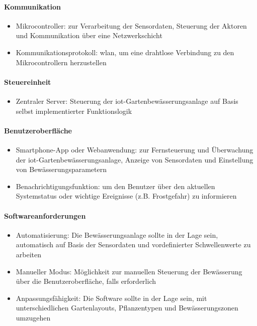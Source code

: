 \paragraph{Kommunikation}
\begin{itemize}
  \item Mikrocontroller: zur Verarbeitung der Sensordaten, Steuerung der Aktoren und Kommunikation über eine Netzwerkschicht
  \item Kommunikationsprotokoll: \gls{wlan}, um eine drahtlose Verbindung zu den Mikrocontrollern herzustellen
\end{itemize}

\paragraph{Steuereinheit}
\begin{itemize}
  \item Zentraler Server: Steuerung der \gls{iot}-Gartenbewässerungsanlage auf Basis selbst implementierter Funktionslogik
\end{itemize}

\paragraph{Benutzeroberfläche}
\begin{itemize}
  \item Smartphone-App oder Webanwendung: zur Fernsteuerung und Überwachung der \gls{iot}-Gartenbewässerungsanlage, Anzeige von Sensordaten und Einstellung von Bewässerungsparametern
  \item Benachrichtigungsfunktion: um den Benutzer über den aktuellen Systemstatus oder wichtige Ereignisse (z.B. Frostgefahr) zu informieren
\end{itemize}

\paragraph{Softwareanforderungen}
\begin{itemize}
  \item Automatisierung: Die Bewässerungsanlage sollte in der Lage sein, automatisch auf Basis der Sensordaten und vordefinierter Schwellenwerte zu arbeiten
  \item Manueller Modus: Möglichkeit zur manuellen Steuerung der Bewässerung über die Benutzeroberfläche, falls erforderlich
  \item Anpassungsfähigkeit: Die Software sollte in der Lage sein, mit unterschiedlichen Gartenlayouts, Pflanzentypen und Bewässerungszonen umzugehen
\end{itemize}


